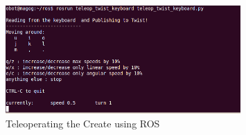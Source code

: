 \begin{itemize}
\begin{figure}[!h]
\centering
\includegraphics[width=0.8\textwidth]{figures/2_teleop_twist.png}
\caption{Teleoperating the Create using ROS}
\label{fig:2_teleop_twist}
\end{figure}


\end{itemize}

\newpage
